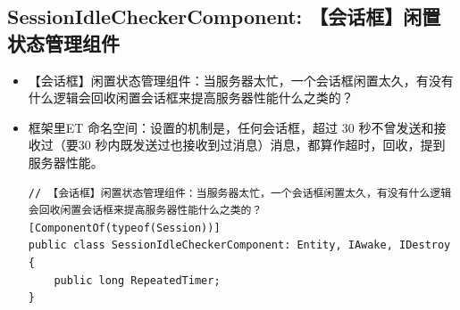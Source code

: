 \documentclass[9pt, b5paper]{article}
\begin{document}
\subsection{SessionIdleCheckerComponent: 【会话框】闲置状态管理组件}
\label{sec-8-14}
\begin{itemize}
\item 【会话框】闲置状态管理组件：当服务器太忙，一个会话框闲置太久，有没有什么逻辑会回收闲置会话框来提高服务器性能什么之类的？
\item 框架里ET 命名空间：设置的机制是，任何会话框，超过 30 秒不曾发送和接收过（要30 秒内既发送过也接收到过消息）消息，都算作超时，回收，提到服务器性能。
\begin{verbatim}
// 【会话框】闲置状态管理组件：当服务器太忙，一个会话框闲置太久，有没有什么逻辑会回收闲置会话框来提高服务器性能什么之类的？
[ComponentOf(typeof(Session))]
public class SessionIdleCheckerComponent: Entity, IAwake, IDestroy {
    public long RepeatedTimer;
}
\end{verbatim}
\end{itemize}
\end{document}

